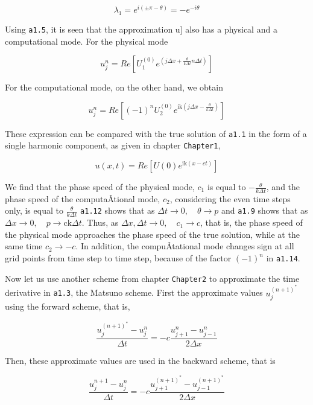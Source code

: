 \[\lambda_{1} = e^{i\left( \pm\pi-\theta\right)} = - e^{- i\theta}\]

Using \texttt{a1.5}, it is seen that the approximation u{]} also has a
physical and a computational mode. For the physical mode

{\[u_{j}^{n} = Re\left\lbrack U_{1}^{\left( 0 \right)}e^{\left( j\Delta x 
+ \frac{\theta}{k\Delta t}n\Delta t \right)} \right\rbrack\]}

For the computational mode, on the other hand, we obtain

{\[u_{j}^{n} = Re\left\lbrack \left( - 1 \right)^{n}U_{2}^{\left( 0 \right)}
e^{\text{ik}\left( j\Delta x - \frac{\theta}{k\Delta t} \right)} \right\rbrack\]}

These expression can be compared with the true solution of \texttt{a1.1}
in the form of a single harmonic component, as given in chapter
\texttt{Chapter1},

{\[u\left( x,t \right) = Re\left\lbrack U\left( 0 \right)e^{\text{ik}
\left( x - c t \right)} \right\rbrack\]}

We find that the phase speed of the physical mode, \(c_{1}\) is equal to
\(- \frac{\theta}{k\Delta t}\), and the phase speed of the
computaÂ­tional mode, \(c_{2}\), considering the even time steps only, is
equal to \(\frac{\theta}{k\Delta t}\) \texttt{a1.12} shows that as
\(\Delta t \rightarrow 0, \quad \theta \rightarrow p\) and \texttt{a1.9}
shows that as
\(\Delta x \rightarrow 0, \quad p  \rightarrow \text{ck}\Delta t\).
Thus, as \(\Delta x,\Delta t \rightarrow 0, \quad c_{1} \rightarrow c\),
that is, the phase speed of the physical mode approaches the phase speed
of the true solution, while at the same time \(c_{2} \rightarrow - c\).
In addition, the compuÂ­tational mode changes sign at all grid points
from time step to time step, because of the factor
\(\left( - 1 \right)^{n}\) in \texttt{a1.14}.

Now let us use another scheme from chapter \texttt{Chapter2} to
approximate the time derivative in \texttt{a1.3}, the Matsuno scheme.
First the approximate values \(u_{j}^{\left( n + 1 \right)^{*}}\) using
the forward scheme, that is,

{\[\frac{u_{j}^{\left( n + 1 \right)^{*}} - u_{j}^{n}}{\Delta t} 
= - c\frac{u_{j + 1}^{n} - u_{j - 1}^{n}}{2\Delta x}\]}

Then, these approximate values are used in the backward scheme, that is

{\[\frac{u_{j}^{n + 1} - u_{j}^{n}}{\Delta t} =
- c\frac{u_{j + 1}^{\left( n + 1 \right)^{*}} - u_{j - 1}^{\left( n + 1 \right)^{*}}}{2\Delta x}\]}

